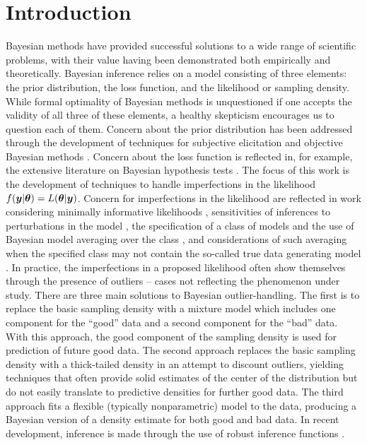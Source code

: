 \documentclass[ba]{imsart}
\def\bth{\mbox{\boldmath $\theta$}}
\newcommand{\by}{\mbox{\boldmath $y$}}
\begin{document}
\begin{frontmatter}

\begin{keyword}
\end{keyword}

\end{frontmatter}

\section{Introduction}
Bayesian methods have provided successful solutions to a wide range of scientific problems, with their value
having been demonstrated both empirically and theoretically.  Bayesian inference relies on a model consisting of three elements:  the prior distribution, the loss function, and the likelihood or sampling density.  While formal optimality of Bayesian methods is unquestioned if one accepts the validity of all three of these elements, a healthy skepticism encourages us to question each of them.  Concern about the prior distribution has been addressed through the development of techniques for subjective elicitation \citep{garthwaite2005, ohagan2006} and objective Bayesian methods \citep{berger2006}.  Concern about the loss function is reflected in, for example, the extensive literature on Bayesian hypothesis tests \citep{kass1995}.  The focus of this work is the development of techniques to handle imperfections in the likelihood $f(\by|\bth) = L(\bth|\by)$. Concern for imperfections in the likelihood are reflected in work considering minimally informative likelihoods \citep{yuan1999minimally}, sensitivities of inferences to perturbations in the model \citep{zhu2011}, the specification of a class of models and the use of Bayesian model averaging over the class \citep{clyde2004}, and considerations of such averaging when the specified class may not contain the so-called true data generating model \citep{bernardo2000, clyde2013, clarke2013Complete}.   In practice, the imperfections in a proposed likelihood often show themselves through the presence of outliers -- cases not reflecting the phenomenon under study. There are three main solutions to Bayesian outlier-handling.  The first is to replace the basic sampling density with a mixture model which includes one component for the ``good'' data and a second component for the ``bad'' data.  With this approach, the good component of the sampling density is used for prediction of future good data.  The second approach replaces the
basic sampling density with a thick-tailed density in an attempt to discount outliers, yielding techniques that often provide solid estimates of the center of the distribution but do not easily translate to predictive densities for further good data.  The third approach fits a flexible (typically nonparametric) model to  the data, producing a Bayesian version of a density estimate for both good and bad data.  In recent development, inference is made through the use of robust inference functions \citep{lee2014}.  
\end{document}
